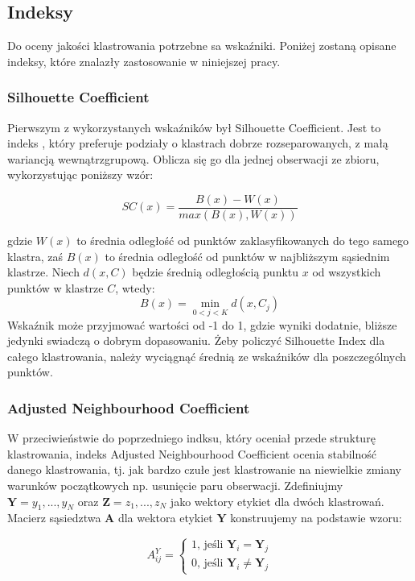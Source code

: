\documentclass{article}
\begin{document}
\subsection{Indeksy}
Do oceny jakości klastrowania potrzebne sa wskaźniki.
Poniżej zostaną opisane indeksy, które znalazły zastosowanie w niniejszej pracy.

\subsubsection{Silhouette Coefficient}
Pierwszym z wykorzystanych wskaźników był Silhouette Coefficient.
Jest to indeks , który preferuje podziały o klastrach dobrze rozseparowanych, z małą wariancją wewnątrzgrupową\citep{Arbelaitz2013}. Oblicza się go dla jednej obserwacji ze zbioru, wykorzystując poniższy wzór:

\[SC(x) = \frac{B(x) - W(x)}{max(B(x),W(x))}\]

gdzie $W(x)$ to średnia odległość od punktów zaklasyfikowanych do tego samego klastra, zaś $B(x)$ to średnia odległość od punktów w najbliższym sąsiednim klastrze\citep{Rousseeuw1987}.
Niech $d(x, C)$ będzie średnią odległością punktu $x$ od wszystkich punktów w klastrze $C$, wtedy:
\[B(x) = \min_{0 < j < K} d(x, C_j)\]
Wskaźnik może przyjmować wartości od -1 do 1, gdzie wyniki dodatnie, bliższe jedynki swiadczą o dobrym dopasowaniu.
Żeby policzyć Silhouette Index dla całego klastrowania, należy wyciągnąć średnią ze wskaźników dla poszczególnych punktów.

\subsubsection{Adjusted Neighbourhood Coefficient}
W przeciwieństwie do poprzedniego indksu, który oceniał przede strukturę klastrowania, indeks Adjusted Neighbourhood Coefficient ocenia stabilność danego klastrowania\citep{Ben-Hur2002}, tj. jak bardzo czułe jest klastrowanie na niewielkie zmiany warunków początkowych np. usunięcie paru obserwacji.
Zdefiniujmy $\textbf{Y} = {y_1, ..., y_N}$ oraz $\textbf{Z} = {z_1, ..., z_N}$ jako wektory etykiet dla dwóch klastrowań. Macierz sąsiedztwa $\textbf{A}$ dla wektora etykiet $\textbf{Y}$ konstruujemy na podstawie wzoru:

$$A^Y_{ij} = \begin{cases}
	1\text{, jeśli} \textbf{ Y}_i = \textbf{Y}_j \\
	0\text{, jeśli}\textbf{ Y}_i \neq \textbf{Y}_j
\end{cases}$$
\end{document}
